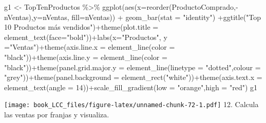 \documentclass[
]{book}
\newenvironment{Shaded}{\begin{snugshade}}{\end{snugshade}}
\newcommand{\AttributeTok}[1]{\textcolor[rgb]{0.77,0.63,0.00}{#1}}
\newcommand{\DecValTok}[1]{\textcolor[rgb]{0.00,0.00,0.81}{#1}}
\newcommand{\FunctionTok}[1]{\textcolor[rgb]{0.00,0.00,0.00}{#1}}
\newcommand{\NormalTok}[1]{#1}
\newcommand{\OtherTok}[1]{\textcolor[rgb]{0.56,0.35,0.01}{#1}}
\newcommand{\SpecialCharTok}[1]{\textcolor[rgb]{0.00,0.00,0.00}{#1}}
\newcommand{\StringTok}[1]{\textcolor[rgb]{0.31,0.60,0.02}{#1}}
\begin{document}
\begin{Shaded}
\begin{Highlighting}[]
\NormalTok{g1 }\OtherTok{\textless{}{-}}\NormalTok{ TopTenProductos }\SpecialCharTok{\%\textgreater{}\%}
    \FunctionTok{ggplot}\NormalTok{(}\FunctionTok{aes}\NormalTok{(}\AttributeTok{x=}\FunctionTok{reorder}\NormalTok{(ProductoComprado,}\SpecialCharTok{{-}}\NormalTok{nVentas),}\AttributeTok{y=}\NormalTok{nVentas, }\AttributeTok{fill=}\NormalTok{nVentas)) }\SpecialCharTok{+}  \FunctionTok{geom\_bar}\NormalTok{(}\AttributeTok{stat =} \StringTok{"identity"}\NormalTok{) }\SpecialCharTok{+}\FunctionTok{ggtitle}\NormalTok{(}\StringTok{"Top 10 Productos más vendidos"}\NormalTok{)}\SpecialCharTok{+}\FunctionTok{theme}\NormalTok{(}\AttributeTok{plot.title =} \FunctionTok{element\_text}\NormalTok{(}\AttributeTok{face=}\StringTok{"bold"}\NormalTok{))}\SpecialCharTok{+}\FunctionTok{labs}\NormalTok{(}\AttributeTok{x=}\StringTok{"Productos"}\NormalTok{, }\AttributeTok{y =}\StringTok{"Ventas"}\NormalTok{)}\SpecialCharTok{+}\FunctionTok{theme}\NormalTok{(}\AttributeTok{axis.line.x =} \FunctionTok{element\_line}\NormalTok{(}\AttributeTok{color =} \StringTok{"black"}\NormalTok{))}\SpecialCharTok{+}\FunctionTok{theme}\NormalTok{(}\AttributeTok{axis.line.y =} \FunctionTok{element\_line}\NormalTok{(}\AttributeTok{color =} \StringTok{"black"}\NormalTok{))}\SpecialCharTok{+}\FunctionTok{theme}\NormalTok{(}\AttributeTok{panel.grid.major.y =} \FunctionTok{element\_line}\NormalTok{(}\AttributeTok{linetype =} \StringTok{"dotted"}\NormalTok{,}\AttributeTok{colour =} \StringTok{"grey"}\NormalTok{))}\SpecialCharTok{+}\FunctionTok{theme}\NormalTok{(}\AttributeTok{panel.background =} \FunctionTok{element\_rect}\NormalTok{(}\StringTok{"white"}\NormalTok{))}\SpecialCharTok{+}\FunctionTok{theme}\NormalTok{(}\AttributeTok{axis.text.x =} \FunctionTok{element\_text}\NormalTok{(}\AttributeTok{angle =} \DecValTok{14}\NormalTok{))}\SpecialCharTok{+}\FunctionTok{scale\_fill\_gradient}\NormalTok{(}\AttributeTok{low =} \StringTok{"orange"}\NormalTok{,}\AttributeTok{high =} \StringTok{"red"}\NormalTok{)}
\NormalTok{g1}
\end{Highlighting}
\end{Shaded}

\texttt{[image: book\_LCC\_files/figure-latex/unnamed-chunk-72-1.pdf]}
12. Calcula las ventas por franjas y visualiza.
\end{document}
